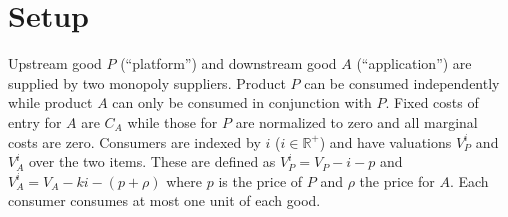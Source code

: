 \documentclass[12pt]{article}
\begin{document}
\setlength{\parindent}{0pt}
\setlength{\parskip}{10pt}

    \newtheorem{theorem}{Theorem}[section]
    \newtheorem{lemma}[theorem]{Lemma}
    \newtheorem{proposition}[theorem]{Proposition}
    \newtheorem{corollary}[theorem]{Corollary}

    \newenvironment{proof}[1][Proof]{\begin{trivlist}
    \item[\hskip \labelsep {\bfseries #1}]}{\end{trivlist}}
    \newenvironment{definition}[1][Definition]{\begin{trivlist}
    \item[\hskip \labelsep {\bfseries #1}]}{\end{trivlist}}
    \newenvironment{example}[1][Example]{\begin{trivlist}
    \item[\hskip \labelsep {\bfseries #1}]}{\end{trivlist}}
    \newenvironment{remark}[1][Remark]{\begin{trivlist}
    \item[\hskip \labelsep {\bfseries #1}]}{\end{trivlist}}

    \newcommand{\qed}{\nobreak \ifvmode \relax \else
          \ifdim\lastskip<1.5em \hskip-\lastskip
          \hskip1.5em plus0em minus0.5em \fi \nobreak
          \vrule height0.75em width0.5em depth0.25em\fi}


\maketitle

\begin{abstract}
\end{abstract}

\section{Setup}

Upstream good $P$ (``platform'') and
downstream good $A$ (``application'') are supplied by two monopoly suppliers. Product $P$ can be consumed independently while product $A$ can
only be consumed in conjunction with $P$.  Fixed costs of entry
for $A$ are $C_A$ while those for $P$ are normalized to zero and all
marginal costs are zero. Consumers are indexed by $i$
($i \in \mathbb{R}^+$) and have valuations $V_P^i$ and  $V_A^i$ over the
two items. These are defined as $V_P^i = V_P - i -p$ and  $V_A^i =  V_A -
ki -(p+\rho)$ where $p$ is the price of $P$ and $\rho$ the price for $A$.
Each consumer consumes at most one unit of each good. 
\end{document}
